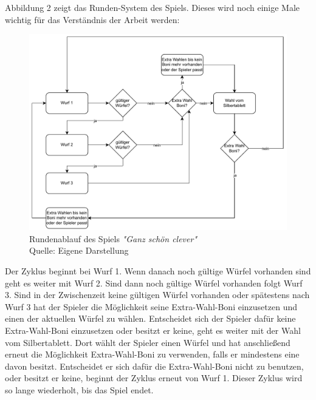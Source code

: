 Abbildung 2 zeigt das Runden-System des Spiels. Dieses wird noch einige Male wichtig für das Verständnis der Arbeit werden:
	\nopagebreak
\begin{figure}[H]
	\includegraphics[width=1\textwidth]{Bilder/Rundenablauf.drawio} 
	\caption[Rundenablauf des Spiels \textit{"Ganz schön clever"}]{Rundenablauf des Spiels \textit{"Ganz schön clever"}\\ Quelle: Eigene Darstellung}
\end{figure}

Der Zyklus beginnt bei Wurf 1. Wenn danach noch gültige Würfel vorhanden sind geht es weiter mit Wurf 2. Sind dann noch gültige Würfel vorhanden folgt Wurf 3. Sind in der Zwischenzeit keine gültigen Würfel vorhanden oder spätestens nach Wurf 3 hat der Spieler die Möglichkeit seine Extra-Wahl-Boni einzusetzen und einen der aktuellen Würfel zu wählen. Entscheidet sich der Spieler dafür keine Extra-Wahl-Boni einzusetzen oder besitzt er keine, geht es weiter mit der Wahl vom Silbertablett. Dort wählt der Spieler einen Würfel und hat anschließend erneut die Möglichkeit Extra-Wahl-Boni zu verwenden, falls er mindestens eine davon besitzt. Entscheidet er sich dafür die Extra-Wahl-Boni nicht zu benutzen, oder besitzt er keine, beginnt der Zyklus erneut von Wurf 1. Dieser Zyklus wird so lange wiederholt, bis das Spiel endet.\\

